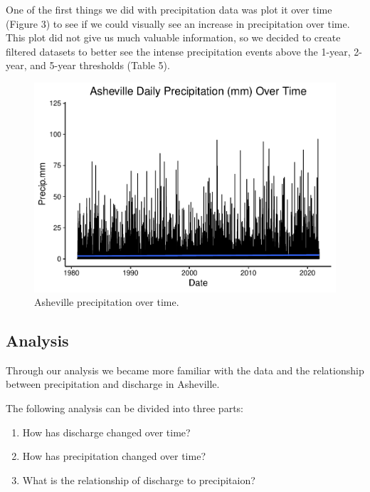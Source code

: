 \documentclass[
]{article}
\begin{document}
One of the first things we did with precipitation data was plot it over
time (Figure 3) to see if we could visually see an increase in
precipitation over time. This plot did not give us much valuable
information, so we decided to create filtered datasets to better see the
intense precipitation events above the 1-year, 2-year, and 5-year
thresholds (Table 5).

\begin{figure}
\centering
\includegraphics{SD_AD_NVT_EDAfinal_files/figure-latex/unnamed-chunk-8-1.pdf}
\caption{Asheville precipitation over time.}
\end{figure}

\newpage

\hypertarget{analysis}{%
\subsection{\texorpdfstring{\textbf{Analysis}}{Analysis}}\label{analysis}}

Through our analysis we became more familiar with the data and the
relationship between precipitation and discharge in Asheville.

The following analysis can be divided into three parts:

\begin{enumerate}
\def\labelenumi{\arabic{enumi}.}
\item
  How has discharge changed over time?
\item
  How has precipitation changed over time?
\item
  What is the relationship of discharge to precipitaion?
\end{enumerate}
\end{document}
